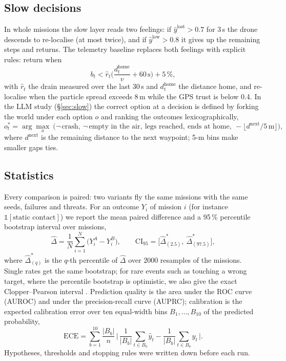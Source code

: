\documentclass[10pt]{article}
\begin{document}
\subsection{Slow decisions}
In whole missions the slow layer reads two feelings: if $\hat y^{\mathrm{lost}}>0.7$ for 3\,s the drone descends to re-localise (at
most twice), and if $\hat y^{\mathrm{low}}>0.8$ it gives up the remaining steps and returns. The telemetry baseline replaces both
feelings with explicit rules: return when
\begin{equation}
b_t<\hat r_t\Big(\frac{d^{\mathrm{home}}_t}{v}+60\,\mathrm{s}\Big)+5\,\%,
\end{equation}
with $\hat r_t$ the drain measured over the last 30\,s and $d^{\mathrm{home}}_t$ the distance home, and re-localise when the
particle spread exceeds 8\,m while the GPS trust is below 0.4. In the LLM study (\S\ref{sec:slow}) the correct option at a decision
is defined by forking the world under each option $o$ and ranking the outcomes lexicographically,
\begin{equation}
o^{*}_t=\arg\max_{o}\ \big(\neg\,\text{crash},\ \neg\,\text{empty in the air},\ \text{legs reached},\ \text{ends at home},\
-\lfloor d^{\mathrm{next}}/5\,\mathrm{m}\rfloor\big),
\end{equation}
where $d^{\mathrm{next}}$ is the remaining distance to the next waypoint; 5-m bins make smaller gaps ties.

\subsection{Statistics}
Every comparison is paired: two variants fly the same missions with the same seeds, failures and threats. For an outcome $Y_i$ of
mission $i$ (for instance $\mathbb{1}[\text{static contact}]$) we report the mean paired difference and a 95\,\% percentile bootstrap
interval \citep{efron1993} over missions,
\begin{equation}
\hat\Delta=\frac1N\sum_{i=1}^{N}\big(Y^{A}_i-Y^{B}_i\big),\qquad
\mathrm{CI}_{95}=\big[\hat\Delta^{*}_{(2.5)},\ \hat\Delta^{*}_{(97.5)}\big],
\end{equation}
where $\hat\Delta^{*}_{(q)}$ is the $q$-th percentile of $\hat\Delta$ over $2000$ resamples of the missions. Single rates get the
same bootstrap; for rare events such as touching a wrong target, where the percentile bootstrap is optimistic, we also give
the exact Clopper--Pearson interval \citep{clopper1934}. Prediction quality is the area under the ROC curve (AUROC) and under the precision-recall curve (AUPRC);
calibration is the expected calibration error \citep{naeini2015,guo2017} over ten equal-width bins $B_1,\dots,B_{10}$ of the predicted probability,
\begin{equation}
\mathrm{ECE}=\sum_{b=1}^{10}\frac{|B_b|}{n}\,\Big|\,\frac{1}{|B_b|}\sum_{t\in B_b}\hat y_t-\frac{1}{|B_b|}\sum_{t\in B_b}y_t\,\Big|.
\end{equation}
Hypotheses, thresholds and stopping rules were written down
before each run.
\end{document}
